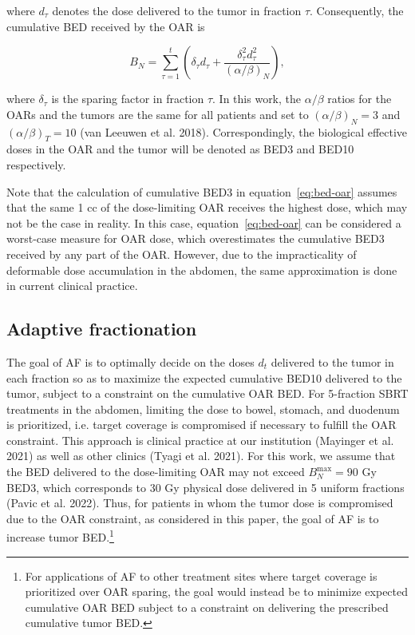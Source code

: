 \documentclass[11pt]{article}
\begin{document}
where $d_{\tau}$ denotes the dose delivered to the tumor in fraction $\tau$. Consequently, the cumulative BED received by the OAR is

\begin{equation}
B_N = \sum_{\tau=1}^{t}\left(\delta_{\tau} d_{\tau} + \frac{\delta_{\tau}^2 d_{\tau}^2}{(\alpha/\beta)_N}\right),
\label{eq:bed-oar}
\end{equation}

where $\delta_{\tau}$ is the sparing factor in fraction $\tau$. In this work, the $\alpha/\beta$ ratios for the OARs and the tumors are the same for all patients and set to $(\alpha/\beta)_N = 3$ and $(\alpha/\beta)_T = 10$ (van Leeuwen et al. 2018). Correspondingly, the biological effective doses in the OAR and the tumor will be denoted as BED3 and BED10 respectively.

Note that the calculation of cumulative BED3 in equation~\eqref{eq:bed-oar} assumes that the same 1 cc of the dose-limiting OAR receives the highest dose, which may not be the case in reality. In this case, equation~\eqref{eq:bed-oar} can be considered a worst-case measure for OAR dose, which overestimates the cumulative BED3 received by any part of the OAR. However, due to the impracticality of deformable dose accumulation in the abdomen, the same approximation is done in current clinical practice.

\subsection{Adaptive fractionation}

The goal of AF is to optimally decide on the doses $d_t$ delivered to the tumor in each fraction so as to maximize the expected cumulative BED10 delivered to the tumor, subject to a constraint on the cumulative OAR BED. For 5-fraction SBRT treatments in the abdomen, limiting the dose to bowel, stomach, and duodenum is prioritized, i.e. target coverage is compromised if necessary to fulfill the OAR constraint. This approach is clinical practice at our institution (Mayinger et al. 2021) as well as other clinics (Tyagi et al. 2021). For this work, we assume that the BED delivered to the dose-limiting OAR may not exceed $B_N^{\max} = 90$ Gy BED3, which corresponds to 30 Gy physical dose delivered in 5 uniform fractions (Pavic et al. 2022). Thus, for patients in whom the tumor dose is compromised due to the OAR constraint, as considered in this paper, the goal of AF is to increase tumor BED.\footnote{For applications of AF to other treatment sites where target coverage is prioritized over OAR sparing, the goal would instead be to minimize expected cumulative OAR BED subject to a constraint on delivering the prescribed cumulative tumor BED.}
\end{document}
